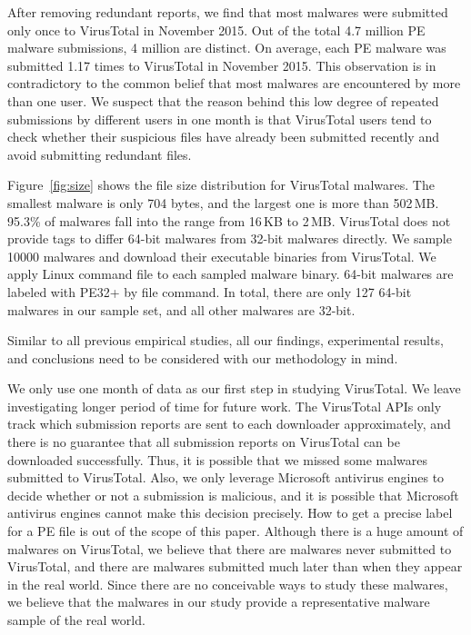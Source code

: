 After removing redundant reports, we find that most malwares were submitted only once to VirusTotal in November 2015. 
Out of the total 4.7 million PE malware submissions, 4 million are distinct. 
On average, each PE malware was submitted 1.17 times to VirusTotal in November 2015. 
This observation is in contradictory to the common belief that most malwares are encountered by more than one user.
We suspect that the reason behind this low degree of repeated submissions by different users in one month
is that VirusTotal users
tend to check whether their suspicious files have already been submitted recently
and avoid submitting redundant files.

Figure~\ref{fig:size} shows the file size distribution for VirusTotal malwares. 
The smallest malware is only 704 bytes, and the largest one is more than 502\,MB. 
95.3\% of malwares fall into the range from 16\,KB to 2\,MB. 
VirusTotal does not provide tags to differ 64-bit malwares from 32-bit malwares directly. 
We sample 10000 malwares and download their executable binaries from VirusTotal.
We apply Linux command file to each sampled malware binary. 
64-bit malwares are labeled with PE32+ by file command. 
In total, there are only 127 64-bit malwares in our sample set, and all other malwares are 32-bit.

Similar to all previous empirical studies, all our findings, experimental results, 
and conclusions need to be considered with our methodology in mind. 

We only use one month of data as our first step in studying VirusTotal. 
We leave investigating longer period of time for future work. 
The VirusTotal APIs only track which submission reports are sent to each downloader approximately, 
and there is no guarantee that all submission reports on VirusTotal can be downloaded successfully. 
Thus, it is possible that we missed some malwares submitted to VirusTotal. 
Also, we only leverage Microsoft antivirus engines to decide whether or not a submission is malicious, 
and it is possible that Microsoft antivirus engines cannot make this decision precisely. 
How to get a precise label for a PE file is out of the scope of this paper.  
Although there is a huge amount of malwares on VirusTotal, we believe that there are malwares never submitted to VirusTotal, 
and there are malwares submitted much later than when they appear in the real world.
Since there are no conceivable ways to study these malwares,
we believe that the malwares in our study provide a representative malware sample of the real world. 



